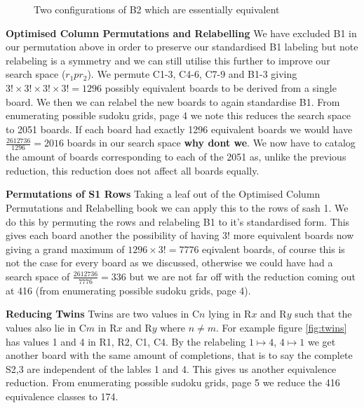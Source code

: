 \documentclass[a4paper,11pt]{report}
\newcounter{row}
\newcounter{col}
\newcounter{rowb}
\newcounter{colb}
\newcommand\setrowb[3]{
  \setcounter{colb}{1}
  \foreach \n in {#1, #2, #3} {
    \edef\x{\value{colb} - 0.5}
    \edef\y{3.5 - \value{rowb}}
    \node[anchor=center] at (\x, \y) {\n};
    \stepcounter{colb}
  }
  \stepcounter{rowb}
}
\begin{document}
\begin{figure}[h!]
\centering
{}
\caption{\label{fig:equiv99}Two configurations of B2 which are essentially equivalent}
\end{figure}

\textbf{Optimised Column Permutations and Relabelling}
We have excluded B1 in our permutation above in order to preserve our standardised B1 labeling but note relabeling is a symmetry and we can still utilise this further to improve our search space ($r_1pr_2$). We permute C1-3, C4-6, C7-9 and B1-3 giving $3!\times 3!\times 3! \times 3!=1296$ possibly equivalent boards to be derived from a single board. We then we can relabel the new boards to again standardise B1. From \cite{}enumerating possible sudoku grids, page 4 we note this reduces the search space to 2051 boards. If each board had exactly 1296 equivalent boards we would have $\frac{2612736}{1296}= 2016$ boards in our search space \textbf{why dont we}.  We now have to catalog the amount of boards corresponding to each of the 2051 as, unlike the previous reduction, this reduction does not affect all boards equally.

\textbf{Permutations of S1 Rows}
Taking a leaf out of the Optimised Column Permutations and Relabelling book we can apply this to the rows of sash 1. We do this by permuting the rows and relabeling B1 to it's standardised form. This gives each board another the possibility of having $3!$ more equivalent boards now giving a grand maximum of $1296\times 3!=7776$ eqivalent boards, of course this is not the case for every board as we discussed, otherwise we could have had a search space of $\frac{2612736}{7776}=336$ but we are not far off with the reduction coming out at 416 (from \cite{}enumerating possible sudoku grids, page 4).

\textbf{Reducing Twins}
Twins are two values in C$n$ lying in R$x$ and R$y$ such that the values also lie in C$m$ in R$x$ and R$y$ where $n\neq m$. For example figure \ref{fig:twins} has values 1 and 4 in R1, R2, C1, C4. By the relabeling $1\mapsto 4$, $4\mapsto 1$ we get another board with the same amount of completions, that is to say the complete S2,3 are independent of the lables 1 and 4. This gives us another equivalence reduction. From \cite{}enumerating possible sudoku grids, page 5 we reduce the 416 equivalence classes to 174.
\end{document}
